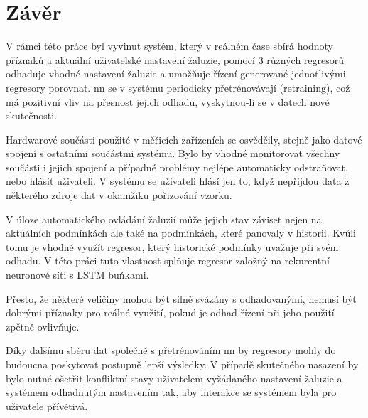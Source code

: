 \chapter{Závěr} \label{chap:conclusion}


    V rámci této práce byl vyvinut systém, který v reálném čase sbírá hodnoty příznaků a aktuální uživatelské nastavení žaluzie, pomocí 3 různých regresorů odhaduje vhodné nastavení žaluzie a umožňuje řízení generované jednotlivými regresory porovnat. \acrshort{nn} se v systému periodicky přetrénovávají (retraining), což má pozitivní vliv na přesnost jejich odhadu, vyskytnou-li se v datech nové skutečnosti.

    Hardwarové součásti použité v měřicích zařízeních se osvědčily, stejně jako datové spojení s ostatními součástmi systému. Bylo by vhodné monitorovat všechny součásti i jejich spojení a případné problémy nejlépe automaticky odstraňovat, nebo hlásit uživateli. V systému se uživateli hlásí jen to, když nepřijdou data z některého zdroje dat v okamžiku pořizování vzorku.

    V úloze automatického ovládání žaluzií může jejich stav záviset nejen na aktuálních podmínkách ale také na podmínkách, které panovaly v historii. Kvůli tomu je vhodné využít regresor, který historické podmínky uvažuje při svém odhadu. V této práci tuto vlastnost splňuje regresor založný na rekurentní neuronové síti s LSTM buňkami.

    Přesto, že některé veličiny mohou být silně svázány s odhadovanými, nemusí být dobrými příznaky pro reálné využití, pokud je odhad řízení při jeho použití zpětně ovlivňuje.

    Díky dalšímu sběru dat společně s přetrénováním \acrshort{nn} by regresory mohly do budoucna poskytovat postupně lepší výsledky. V případě skutečného nasazení by bylo nutné ošetřit konfliktní stavy uživatelem vyžádaného nastavení žaluzie a systémem odhadnutým nastavením tak, aby interakce se systémem byla pro uživatele přívětivá.